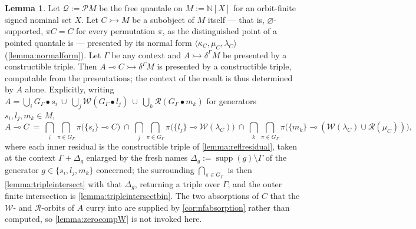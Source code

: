 \documentclass{article}
\theoremstyle{definition}
\newtheorem{lemma}{Lemma}[section]
\newcommand{\N}{\mathbb{N}}
\newcommand{\cP}{\mathcal{P}}
\newcommand{\cQ}{\mathcal{Q}}
\newcommand{\cR}{\mathcal{R}}
\newcommand{\cW}{\mathcal{W}}
\newcommand{\supp}{\operatorname{supp}}
\begin{document}
\begin{lemma}
    \label{lemma:tripleresidual}
    Let $\cQ:=\cP M$ be the free quantale on $M:=\N[X]$ for an orbit-finite signed nominal set $X$. Let $C\rightarrowtail M$ be a subobject of $M$ itself --- that is, $\varnothing$-supported, $\pi C=C$ for every permutation $\pi$, as the distinguished point of a pointed quantale is --- presented by its normal form $\langle\kappa_C,\mu_C,\lambda_C\rangle$ (\cref{lemma:normalform}). Let $\Gamma$ be any context and $A\rightarrowtail\delta^\Gamma M$ be presented by a constructible triple. Then $A\multimap C\rightarrowtail\delta^\Gamma M$ is presented by a constructible triple, computable from the presentations; the context of the result is thus determined by $A$ alone. Explicitly, writing $A=\bigcup_iG_\Gamma\bullet s_i\ \cup\ \bigcup_j\cW(G_\Gamma\bullet l_j)\ \cup\ \bigcup_k\cR(G_\Gamma\bullet m_k)$ for generators $s_i,l_j,m_k\in M$,
    $$A\multimap C\ =\ \bigcap_i\bigcap_{\pi\in G_\Gamma}\pi\bigl(\{s_i\}\multimap C\bigr)\ \cap\ \bigcap_j\bigcap_{\pi\in G_\Gamma}\pi\bigl(\{l_j\}\multimap\cW(\lambda_C)\bigr)\ \cap\ \bigcap_k\bigcap_{\pi\in G_\Gamma}\pi\bigl(\{m_k\}\multimap(\cW(\lambda_C)\cup\cR(\mu_C))\bigr),$$
    where each inner residual is the constructible triple of \cref{lemma:reflresidual}, taken at the context $\Gamma+\Delta_g$ enlarged by the fresh names $\Delta_g:=\supp(g)\setminus\Gamma$ of the generator $g\in\{s_i,l_j,m_k\}$ concerned; the surrounding $\bigcap_{\pi\in G_\Gamma}$ is then \cref{lemma:tripleintersect} with that $\Delta_g$, returning a triple over $\Gamma$; and the outer finite intersection is \cref{lemma:tripleintersectbin}. The two absorptions of $C$ that the $\cW$- and $\cR$-orbits of $A$ curry into are supplied by \cref{cor:nfabsorption} rather than computed, so \cref{lemma:zerocompW} is not invoked here.
\end{lemma}
\end{document}

